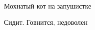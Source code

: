 \documentclass[a4paper, 12pt]{report}
\begin{document}
Мохнатый кот на запушистке

Сидит. Говнится, недоволен




%
\end{document}
